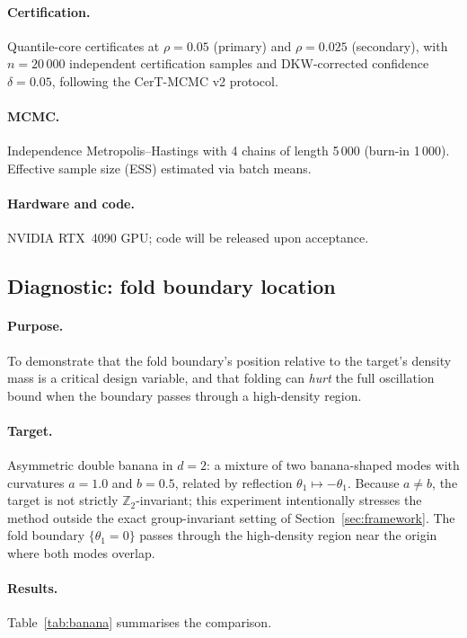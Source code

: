 \paragraph{Certification.}
Quantile-core certificates at $\rho = 0.05$ (primary) and
$\rho = 0.025$ (secondary), with $n = 20\,000$ independent
certification samples and DKW-corrected confidence $\delta = 0.05$,
following the CerT-MCMC v2 protocol.

\paragraph{MCMC.}
Independence Metropolis--Hastings with 4 chains of length 5\,000
(burn-in 1\,000).  Effective sample size (ESS) estimated via
batch means.

\paragraph{Hardware and code.}
NVIDIA RTX~4090 GPU; code will be released upon acceptance.


\subsection{Diagnostic: fold boundary location}
\label{sec:exp_banana}

\paragraph{Purpose.}
To demonstrate that the fold boundary's position relative to
the target's density mass is a critical design variable,
and that folding can \emph{hurt} the full oscillation bound
when the boundary passes through a high-density region.

\paragraph{Target.}
Asymmetric double banana in $d = 2$: a mixture of two
banana-shaped modes with curvatures $a = 1.0$ and $b = 0.5$,
related by reflection $\theta_1 \mapsto -\theta_1$.
Because $a \neq b$, the target is not strictly
$\mathbb{Z}_2$-invariant; this experiment intentionally
stresses the method outside the exact group-invariant setting
of Section~\ref{sec:framework}.
The fold boundary $\{\theta_1 = 0\}$ passes through the
high-density region near the origin where both modes overlap.

\paragraph{Results.}
Table~\ref{tab:banana} summarises the comparison.

